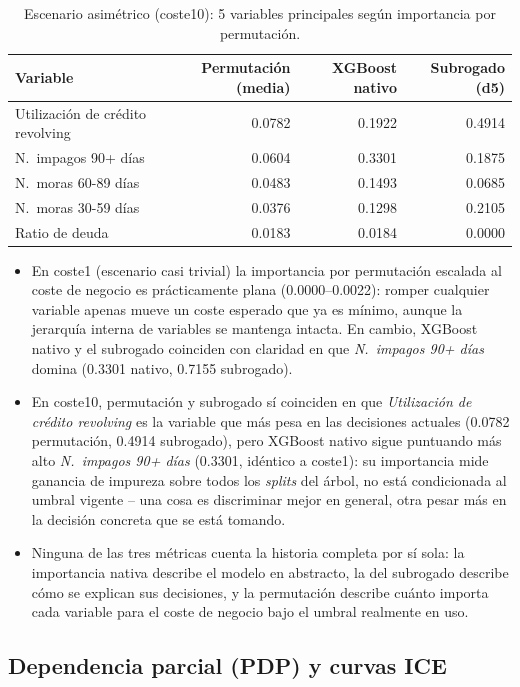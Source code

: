 \documentclass[11pt,a4paper]{article}
\begin{document}
\begin{table}[H]
\centering
\caption{Escenario asimétrico (coste10): 5 variables principales según importancia por permutación.}
\begin{tabular}{lrrr}
\toprule
Variable & Permutación (media) & XGBoost nativo & Subrogado (d5) \\
\midrule
Utilización de crédito revolving & 0.0782 & 0.1922 & 0.4914 \\
N.\ impagos 90+ días & 0.0604 & 0.3301 & 0.1875 \\
N.\ moras 60-89 días & 0.0483 & 0.1493 & 0.0685 \\
N.\ moras 30-59 días & 0.0376 & 0.1298 & 0.2105 \\
Ratio de deuda & 0.0183 & 0.0184 & 0.0000 \\
\bottomrule
\end{tabular}
\label{tab:permutacion-coste10}
\end{table}

\begin{itemize}
\item En coste1 (escenario casi trivial) la importancia por permutación escalada al coste de negocio es
prácticamente plana (0.0000--0.0022): romper cualquier variable apenas mueve un coste esperado que ya es
mínimo, aunque la jerarquía interna de variables se mantenga intacta. En cambio, XGBoost nativo y el
subrogado coinciden con claridad en que \emph{N.\ impagos 90+ días} domina (0.3301 nativo, 0.7155
subrogado).
\item En coste10, permutación y subrogado sí coinciden en que \emph{Utilización de crédito revolving} es
la variable que más pesa en las decisiones actuales (0.0782 permutación, 0.4914 subrogado), pero XGBoost
nativo sigue puntuando más alto \emph{N.\ impagos 90+ días} (0.3301, idéntico a coste1): su importancia
mide ganancia de impureza sobre todos los \emph{splits} del árbol, no está condicionada al umbral vigente
-- una cosa es discriminar mejor en general, otra pesar más en la decisión concreta que se está tomando.
\item Ninguna de las tres métricas cuenta la historia completa por sí sola: la importancia nativa describe
el modelo en abstracto, la del subrogado describe cómo se explican sus decisiones, y la permutación describe
cuánto importa cada variable para el coste de negocio bajo el umbral realmente en uso.
\end{itemize}

\subsection{Dependencia parcial (PDP) y curvas ICE}
\end{document}
